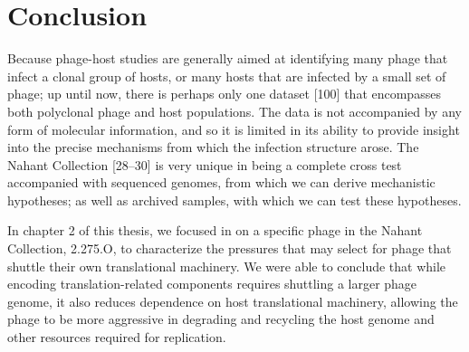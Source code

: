 \documentclass[12pt,twoside]{mitthesis-manusdown}
\begin{document}
\chapter{Conclusion}\label{conclusion}

Because phage-host studies are generally aimed at identifying many phage
that infect a clonal group of hosts, or many hosts that are infected by
a small set of phage; up until now, there is perhaps only one dataset
{[}100{]} that encompasses both polyclonal phage and host populations.
The data is not accompanied by any form of molecular information, and so
it is limited in its ability to provide insight into the precise
mechanisms from which the infection structure arose. The Nahant
Collection {[}28--30{]} is very unique in being a complete cross test
accompanied with sequenced genomes, from which we can derive mechanistic
hypotheses; as well as archived samples, with which we can test these
hypotheses.

In chapter 2 of this thesis, we focused in on a specific phage in the
Nahant Collection, 2.275.O, to characterize the pressures that may
select for phage that shuttle their own translational machinery. We were
able to conclude that while encoding translation-related components
requires shuttling a larger phage genome, it also reduces dependence on
host translational machinery, allowing the phage to be more aggressive
in degrading and recycling the host genome and other resources required
for replication.
\end{document}
